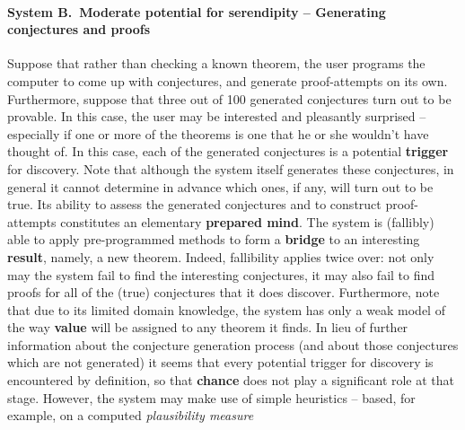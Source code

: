 \paragraph{System B.~Moderate potential for serendipity -- Generating
  conjectures and proofs}
Suppose that rather than checking a known theorem, the user programs
the computer to come up with conjectures, and generate proof-attempts
on its own.  Furthermore, suppose that three out of 100 generated
conjectures turn out to be provable.  In this case, the user may be
interested and pleasantly surprised -- especially if one or more of
the theorems is one that he or she wouldn't have thought of.  In this
case, each of the generated conjectures is a potential
\textbf{trigger} for discovery.  Note that although the system itself
generates these conjectures, in general it cannot determine in advance
which ones, if any, will turn out to be true.  Its ability to assess
the generated conjectures and to construct proof-attempts constitutes
an elementary \textbf{prepared mind}.  The system is (fallibly) able
to apply pre-programmed methods to form a \textbf{bridge} to an
interesting \textbf{result}, namely, a new theorem.  Indeed,
fallibility applies twice over: not only may the system fail to find
the interesting conjectures, it may also fail to find proofs for all
of the (true) conjectures that it does discover.  Furthermore, note
that due to its limited domain knowledge, the system has only a weak
model of the way \textbf{value} will be assigned to any theorem it
finds.
In lieu of further information about the conjecture generation process
(and about those conjectures which are not generated)
it seems that every potential trigger for discovery is
encountered by definition, so that \textbf{chance} does
not play a significant role at that stage.
However, the system may make use of simple heuristics -- based, for
example, on a computed \emph{plausibility measure}
